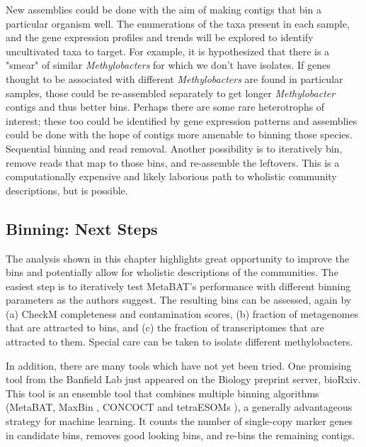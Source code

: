 New assemblies could be done with the aim of making contigs that bin a particular organism well.
The enumerations of the taxa present in each sample, and the gene expression profiles and trends will be explored to identify uncultivated taxa to target.
For example, it is hypothesized that there is a "smear" of similar \textit{Methylobacters} for which we don't have isolates.
If genes thought to be associated with different \textit{Methylobacters} are found in particular samples, those could be re-assembled separately to get longer \textit{Methylobacter} contigs and thus better bins.
Perhaps there are some rare heterotrophs of interest; these too could be identified by gene expression patterns and assemblies could be done with the hope of contigs more amenable to binning those species.
Sequential binning and read removal.
Another possibility is to iteratively bin, remove reads that map to those bins, and re-assemble the leftovers.
This is a computationally expensive and likely laborious path to wholistic community descriptions, but is possible.

\subsection{Binning: Next Steps}

The analysis shown in this chapter highlights great opportunity to improve the bins and potentially allow for wholistic descriptions of the communities.
The easiest step is to iteratively test MetaBAT's performance with different binning parameters as the authors suggest.
The resulting bins can be assessed, again by (a) CheckM completeness and contamination scores, (b) fraction of metagenomes that are attracted to bins, and (c) the fraction of transcriptomes that are attracted to them.
Special care can be taken to isolate different methylobacters.

In addition, there are many tools which have not yet been tried.
One promising tool from the Banfield Lab \cite{sieber2017} just appeared on the Biology preprint server, bioRxiv.
This tool is an ensemble tool that combines multiple binning algorithms (MetaBAT\cite{metabat2015}, MaxBin \cite{wu2015}, CONCOCT \cite{concoct2014} and tetraESOMs \cite{dick2009}), a generally advantageous strategy for machine learning.
It counts the number of single-copy marker genes in candidate bins, removes good looking bins, and re-bins the remaining contigs.


